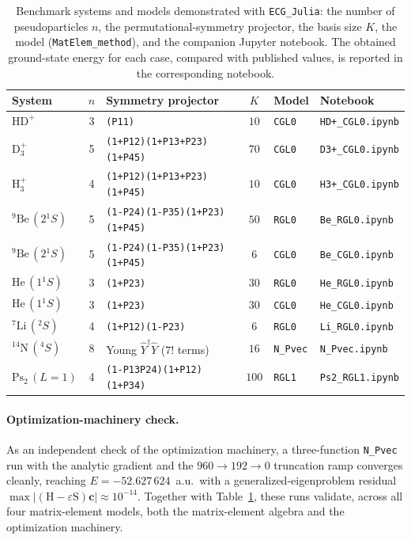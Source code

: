\documentclass[11pt]{article}
\newcommand{\Ycal}{\hat{Y}}
\begin{document}
\begin{table}[ht]
\centering
\small
\renewcommand{\arraystretch}{1.3}
\begin{tabular}{@{}l c l c l l@{}}
\toprule
System & $n$ & Symmetry projector & $K$ & Model & Notebook \\
\midrule
$\mathrm{HD^+}$ & 3 & \verb|(P11)| & $10$ & \texttt{CGL0} & \texttt{HD+\_CGL0.ipynb} \\
$\mathrm{D_3^+}$ & 5 & \verb|(1+P12)(1+P13+P23)(1+P45)| & $70$ & \texttt{CGL0} & \texttt{D3+\_CGL0.ipynb} \\
$\mathrm{H_3^+}$ & 4 & \verb|(1+P12)(1+P13+P23)(1+P45)| & $10$ & \texttt{CGL0} & \texttt{H3+\_CGL0.ipynb} \\
$^9\mathrm{Be}\,(2{}^1S)$ & 5 & \verb|(1-P24)(1-P35)(1+P23)(1+P45)| & $50$ & \texttt{RGL0} & \texttt{Be\_RGL0.ipynb} \\
$^9\mathrm{Be}\,(2{}^1S)$ & 5 & \verb|(1-P24)(1-P35)(1+P23)(1+P45)| & $6$ & \texttt{CGL0} & \texttt{Be\_CGL0.ipynb} \\
$\mathrm{He}\,(1{}^1S)$ & 3 & \verb|(1+P23)| & $30$ & \texttt{RGL0} & \texttt{He\_RGL0.ipynb} \\
$\mathrm{He}\,(1{}^1S)$ & 3 & \verb|(1+P23)| & $30$ & \texttt{CGL0} & \texttt{He\_CGL0.ipynb} \\
$^7\mathrm{Li}\,({}^2S)$ & 4 & \verb|(1+P12)(1-P23)| & $6$ & \texttt{RGL0} & \texttt{Li\_RGL0.ipynb} \\
$^{14}\mathrm{N}\,({}^4S)$ & 8 & Young $\Ycal^{\dagger}\Ycal$ ($7!$ terms) & $16$ & \texttt{N\_Pvec} & \texttt{N\_Pvec.ipynb} \\
$\mathrm{Ps_2}\,(L{=}1)$ & 4 & \verb|(1-P13P24)(1+P12)(1+P34)| & $100$ & \texttt{RGL1} & \texttt{Ps2\_RGL1.ipynb} \\
\bottomrule
\end{tabular}
\caption{Benchmark systems and models demonstrated with \texttt{ECG\_Julia}: the
number of pseudoparticles $n$, the permutational-symmetry projector, the basis
size $K$, the model (\texttt{MatElem\_method}), and the companion Jupyter
notebook. The obtained ground-state energy for each case, compared with published
values, is reported in the corresponding notebook.}
\label{tab:results}
\end{table}

\paragraph{Optimization-machinery check.}
As an independent check of the optimization machinery, a three-function
\texttt{N\_Pvec} run with the analytic gradient and the $960\to192\to0$
truncation ramp converges cleanly, reaching $E=-52.627\,624$~a.u.\ with a
generalized-eigenproblem residual
$\max|(\mathrm{H}-\varepsilon\mathrm{S})\mathbf{c}|\approx10^{-14}$. Together with
Table~\ref{tab:results}, these runs validate, across all four matrix-element
models, both the matrix-element algebra and the optimization machinery.
\end{document}
